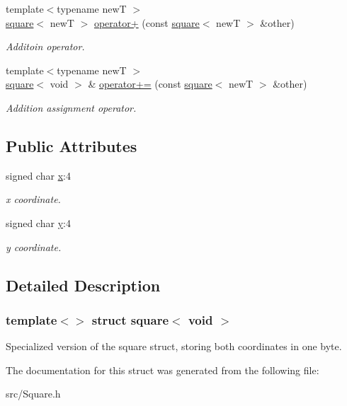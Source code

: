 \begin{DoxyCompactItemize}
{\footnotesize template$<$typename newT $>$ }\\\hyperlink{structsquare}{square}$<$ newT $>$ \hyperlink{structsquare_3_01void_01_4_ab7ae9a220b3d4aa3afce1873c25558eb}{operator+} (const \hyperlink{structsquare}{square}$<$ newT $>$ \&other)
\begin{DoxyCompactList}\small\item\em Additoin operator. \end{DoxyCompactList}\item 
\mbox{\label{structsquare_3_01void_01_4_ad485847afc64f74cbae220e801dd3c38}} 
{\footnotesize template$<$typename newT $>$ }\\\hyperlink{structsquare}{square}$<$ void $>$ \& \hyperlink{structsquare_3_01void_01_4_ad485847afc64f74cbae220e801dd3c38}{operator+=} (const \hyperlink{structsquare}{square}$<$ newT $>$ \&other)
\begin{DoxyCompactList}\small\item\em Addition assignment operator. \end{DoxyCompactList}\end{DoxyCompactItemize}
\subsection*{Public Attributes}
\begin{DoxyCompactItemize}
\item 
\mbox{\label{structsquare_3_01void_01_4_a1b2185b1eacd68916a02287c21916a25}} 
signed char \hyperlink{structsquare_3_01void_01_4_a1b2185b1eacd68916a02287c21916a25}{x}\+:4
\begin{DoxyCompactList}\small\item\em x coordinate. \end{DoxyCompactList}\item 
\mbox{\label{structsquare_3_01void_01_4_a2f5565ddd32970d151f1973db2fc3881}} 
signed char \hyperlink{structsquare_3_01void_01_4_a2f5565ddd32970d151f1973db2fc3881}{y}\+:4
\begin{DoxyCompactList}\small\item\em y coordinate. \end{DoxyCompactList}\end{DoxyCompactItemize}


\subsection{Detailed Description}
\subsubsection*{template$<$$>$\newline
struct square$<$ void $>$}

Specialized version of the square struct, storing both coordinates in one byte. 

The documentation for this struct was generated from the following file\+:\begin{DoxyCompactItemize}
\item 
src/Square.\+h\end{DoxyCompactItemize}
